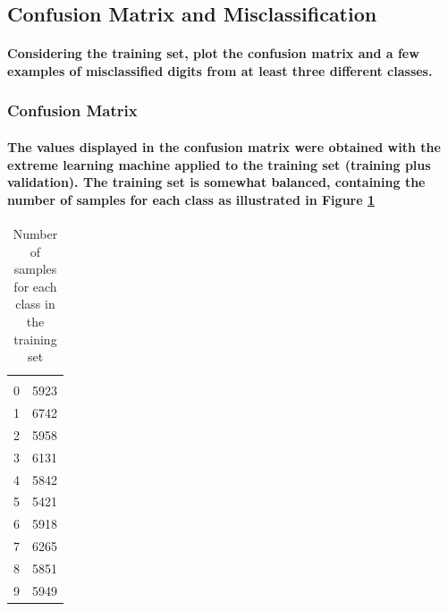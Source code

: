 \documentclass[a4paper]{article}    %
\begin{document}
\subsection{Confusion Matrix and Misclassification}

\paragraph{Considering the training set, plot the confusion matrix and a few examples of misclassified digits from at least three different classes.}

\subsubsection{Confusion Matrix}

\paragraph{The values displayed in the confusion matrix were obtained with the extreme learning machine applied to the training set (training plus validation). The training set is somewhat balanced, containing the number of samples for each class as illustrated in Figure \ref{tab:samples_training_set}}

\begin{table}[H]
    \begin{center}
        \begin{tabular}{|c|c|} 
            \cline{1-2}
            \cellcolor[gray]{0.8}{Digit} & \cellcolor[gray]{0.8}{nº of samples} \\
            \cline{1-2}
            0 & 5923 \\
            1 & 6742 \\
            2 & 5958 \\
            3 & 6131 \\
            4 & 5842 \\
            5 & 5421 \\
            6 & 5918 \\
            7 & 6265 \\
            8 & 5851 \\
            9 & 5949 \\
            \cline{1-2}
        \end{tabular}
    \end{center}
    \caption{Number of samples for each class in the training set}
    \label{tab:samples_training_set}
\end{table}
\end{document}
